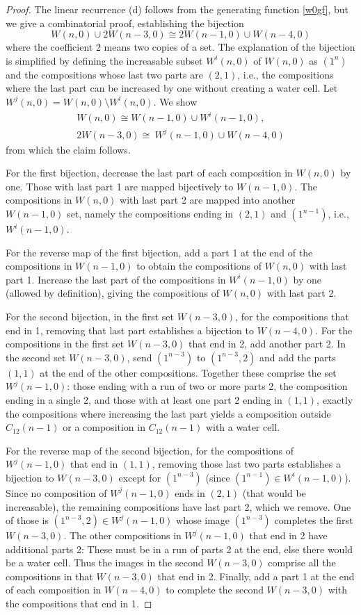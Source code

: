 \documentclass[10pt,a4paper]{amsart}
\begin{document}
\begin{proof}
The linear recurrence (d) follows from the generating function \eqref{w0gf}, but we give a combinatorial proof, establishing the bijection
\[W(n,0) \cup 2W(n-3,0) \cong 2W(n-1,0) \cup W(n-4,0)\]
where the coefficient 2 means two copies of a set.  The explanation of the bijection is simplified by defining the increasable subset $W^i(n,0)$ of $W(n,0)$ as $(1^n)$ and the compositions whose last two parts are $(2,1)$, i.e., the compositions where the last part can be increased by one without creating a water cell.  Let $W^j(n,0) = W(n,0) \setminus W^i(n,0)$.  We show 
\begin{gather*}
W(n,0) \cong W(n-1,0) \cup W^i(n-1,0), \\
2W(n-3,0) \cong\ W^j(n-1,0) \cup W(n-4,0)
\end{gather*}
from which the claim follows.

For the first bijection, decrease the last part of each composition in $W(n,0)$ by one.  Those with last part 1 are mapped bijectively to $W(n-1,0)$.  The compositions in $W(n,0)$ with last part 2 are mapped into another $W(n-1,0)$ set, namely the compositions ending in $(2,1)$ and $(1^{n-1})$, i.e., $W^i(n-1,0)$.

For the reverse map of the first bijection, add a part 1 at the end of the compositions in $W(n-1,0)$ to obtain the compositions of $W(n,0)$ with last part 1.  Increase the last part of the compositions in $W^i(n-1,0)$ by one (allowed by definition), giving the compositions of $W(n,0)$ with last part 2.

For the second bijection, in the first set $W(n-3,0)$, for the compositions that end in 1, removing that last part establishes a bijection to $W(n-4,0)$.  For the compositions in the first set $W(n-3,0)$ that end in 2, add another part 2.  In the second set $W(n-3,0)$, send $(1^{n-3})$ to $(1^{n-3},2)$ and add the parts $(1,1)$ at the end of the other compositions.  Together these comprise the set $W^j(n-1,0)$: those ending with a run of two or more parts 2, the composition ending in a single 2, and those with at least one part 2 ending in $(1,1)$, exactly the compositions where increasing the last part yields a composition outside $C_{12}(n-1)$ or a composition in $C_{12}(n-1)$ with a water cell.

For the reverse map of the second bijection, for the compositions of $W^j(n-1,0)$ that end in $(1,1)$, removing those last two parts establishes a bijection to $W(n-3,0)$ except for $(1^{n-3})$ (since $(1^{n-1}) \in W^i(n-1,0)$).  Since no composition of $W^j(n-1,0)$ ends in $(2,1)$ (that would be increasable), the remaining compositions have last part 2, which we remove.  One of those is $(1^{n-3},2) \in W^j(n-1,0)$ whose image $(1^{n-3})$ completes the first $W(n-3,0)$.  The other compositions in $W^j(n-1,0)$ that end in 2 have additional parts 2: These must be in a run of parts 2 at the end, else there would be a water cell.  Thus the images in the second $W(n-3,0)$ comprise all the compositions in that $W(n-3,0)$ that end in 2.  Finally, add a part 1 at the end of each composition in $W(n-4,0)$ to complete the second $W(n-3,0)$ with the compositions that end in 1.
\end{proof}
\end{document}
